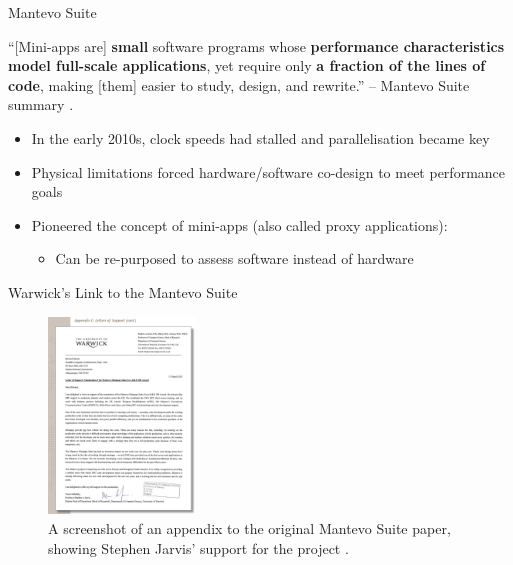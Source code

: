\documentclass[10pt,aspectratio=169]{beamer}
\begin{document}
\begin{frame}{Mantevo Suite}
    \begin{displayquote}
        \vspace{0.2cm}
        ``[Mini-apps are] \textbf{small} software programs whose \textbf{performance characteristics model full-scale applications}, yet require only \textbf{a fraction of the lines of code}, making [them] easier to study, design, and rewrite.'' -- Mantevo Suite summary \cite{heroux2013mantevo}.
    \end{displayquote}
    \vspace*{0.25cm}
    \begin{itemize}
        \item In the early 2010s, clock speeds had stalled and parallelisation became key
        \item Physical limitations forced hardware/software co-design to meet performance goals
        \item Pioneered the concept of mini-apps (also called proxy applications):
        \begin{itemize}
            \item Can be re-purposed to assess software instead of hardware
        \end{itemize}
    \end{itemize}
\end{frame}

\begin{frame}{Warwick's Link to the Mantevo Suite}
    \begin{figure}[H]
        \includegraphics[width=0.35\textwidth]{images/warwick_mantevo_link.png}
        \caption{A screenshot of an appendix to the original Mantevo Suite paper, showing Stephen Jarvis' support for the project \cite{heroux2013mantevo}.}
        \label{fig:warwick_mantevo_link}
    \end{figure}
\end{frame}
\end{document}
